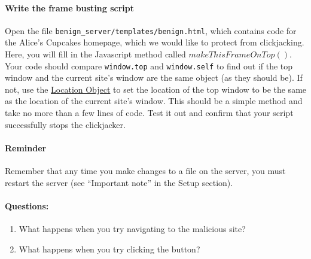 \paragraph{Write the frame busting script} 

Open the file \texttt{benign\_server/templates/benign.html}, which
contains code for the Alice's Cupcakes homepage, which we would like to
protect from clickjacking. Here, you will fill in the Javascript method
called $makeThisFrameOnTop()$. Your code should compare
\texttt{window.top} and \texttt{window.self} to find out if the top
window and the current site's window are the same object (as they should
be). If not, use the
\href{https://developer.mozilla.org/en-US/docs/Web/API/Location}{Location
Object} to set the location of the top window to be the same as the
location of the current site's window. This should be a simple method
and take no more than a few lines of code. Test it out and confirm that
your script successfully stops the clickjacker. 

\paragraph{Reminder} Remember that any time you make changes to a file
on the server, you must restart the server (see ``Important note'' in
the Setup section). 





\paragraph{Questions:}
\begin{enumerate}
    \item What happens when you try navigating to the malicious site?
    \item What happens when you try clicking the button?
\end{enumerate}



